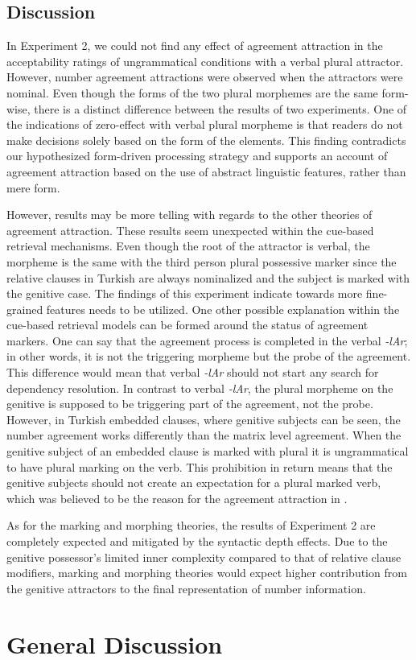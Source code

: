 \documentclass[doc,a4paper,man,natbib,floatsintext,noextraspace]{apa6}\usepackage[]{graphicx}\usepackage[]{color}
\begin{document}
\subsection{Discussion} \label{sec:exp2:discussion}


In Experiment 2, we could not find any effect of agreement attraction in the acceptability ratings of ungrammatical conditions with a verbal plural attractor. However, number agreement attractions were observed when the attractors were nominal. Even though the forms of the two plural morphemes are the same form-wise, there is a distinct difference between the results of two experiments. One of the indications of zero-effect with verbal plural morpheme is that readers do not make decisions solely based on the form of the elements. This finding contradicts our hypothesized form-driven processing strategy and supports an account of agreement attraction based on the use of abstract linguistic features, rather than mere form.

However, results may be more telling with regards to the other theories of agreement attraction. These results seem unexpected within the cue-based retrieval mechanisms. Even though the root of the attractor is verbal, the morpheme is the same with the third person plural possessive marker since the relative clauses in Turkish are always nominalized and the subject is marked with the genitive case. The findings of this experiment indicate towards more fine-grained features needs to be utilized. One other possible explanation within the cue-based retrieval models can be formed around the status of agreement markers. One can say that the agreement process is completed in the verbal \textit{-lAr}; in other words, it is not the triggering morpheme but the probe of the agreement. This difference would mean that verbal \textit{-lAr} should not start any search for dependency resolution. In contrast to verbal \textit{-lAr}, the plural morpheme on the genitive is supposed to be triggering part of the agreement, not the probe. However, in Turkish embedded clauses, where genitive subjects can be seen, the number agreement works differently than the matrix level agreement. When the genitive subject of an embedded clause is marked with plural it is ungrammatical to have plural marking on the verb. 
This prohibition in return means that the genitive subjects should not create an expectation for a plural marked verb, which was believed to be the reason for the agreement attraction in \citet{LagoEtAl:2018}.


As for the marking and morphing theories, the results of Experiment 2 are completely expected and mitigated by the syntactic depth effects. Due to the genitive possessor's limited inner complexity compared to that of relative clause modifiers, marking and morphing theories would expect higher contribution from the genitive attractors to the final representation of number information. 


\section{General Discussion} \label{sec:general_discussion}




\end{document}
